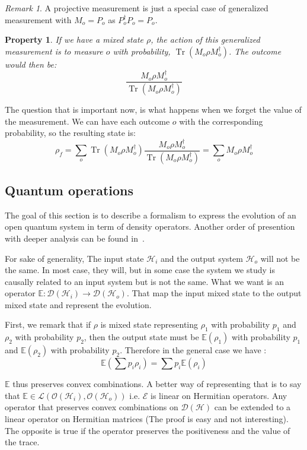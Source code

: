 \documentclass[10pt,a4paper]{report}
\theoremstyle{plain}
\newtheorem{prop}[thm]{Property}
\theoremstyle{definition}
\theoremstyle{remark}
\newtheorem*{rem}{Remark}
\DeclareMathOperator{\Tr}{Tr}
\newcommand{\trnorm}[1]{\frac{#1}{\Tr\left({#1}\right)}}
\begin{document}
\begin{rem}
  A projective measurement is just a special case of generalized measurement
  with $M_o=P_o$ as $P_o^\dagger P_o = P_o$.
\end{rem}

\begin{prop}
  If we have a mixed state $\rho$, the action of this generalized measurement is
  to measure $o$ with probability, $\Tr(M_o\rho M_o^\dagger)$. The outcome would
  then be:
  \[\trnorm{M_o\rho M_o^\dagger}\]
\end{prop}

The question that is important now, is what happens when we forget the value of
the measurement. We can have each outcome $o$ with the corresponding
probability, so the resulting state is:
\[\rho_f = \sum_o \Tr(M_o\rho M_o^\dagger)\trnorm{M_o\rho M_o^\dagger}
  =\sum_o M_o\rho M_o^\dagger \]



\subsection{Quantum operations}

The goal of this section is to describe a formalism to express the evolution of
an open quantum system in term of density operators. Another order of presention
with deeper analysis can be found in~\cite{QCQI}.

For sake of generality, The input state
$\mathcal{H}_i$ and the output system $\mathcal{H}_o$ will not be the same. In
most case, they will, but in some case the system we study is causally related to
an input system but is not the same.
What we want is an operator $\mathbb{E} : \mathcal{D}(\mathcal{H}_i) \to
\mathcal{D}(\mathcal{H}_o)$. That map the input mixed state to the output mixed
state and represent the evolution.

First, we remark that if $\rho$ is mixed state representing $\rho_1$ with
probability $p_1$ and $\rho_2$ with probability $p_2$, then the output state
must be $\mathbb E(\rho_1)$ with probability $p_1$ and $\mathbb E(\rho_2)$ with
probability $p_2$. Therefore in the general case we have :
\[\mathbb E(\sum p_i \rho_i) = \sum p_i \mathbb E(\rho_i)\]

$\mathbb E$ thus preserves convex combinations. A better way of representing
that is to say that $\mathbb E \in
\mathcal{L}(\mathcal{O}(\mathcal{H}_i),\mathcal{O}(\mathcal{H}_o))$ i.e.
$\mathcal{E}$ is linear on Hermitian operators. Any operator that preserves
convex combinations on $\mathcal{D}(\mathcal{H})$ can be extended to a linear
operator on Hermitian matrices (The proof is easy and not interesting). The
opposite is true if the operator preserves the positiveness and the value of the
trace.
\end{document}

